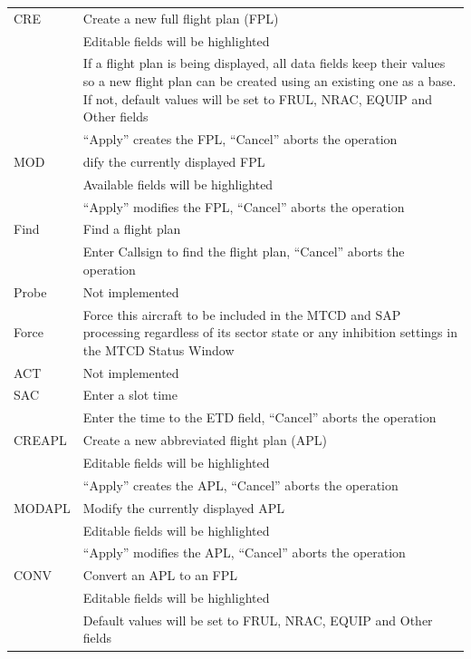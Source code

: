 \documentclass[11pt,a4paper,oldfontcommands]{memoir}
\begin{document}
\begin{tabular}{l l}
    CRE         & Create a new full flight plan (FPL)\\
                & Editable fields will be highlighted\\
                & If a flight plan is being displayed, all data fields keep their values so a new flight plan can be created using an existing one as a base. If not, default values will be set to FRUL, NRAC, EQUIP and Other fields\\
                & “Apply” creates the FPL, “Cancel” aborts the operation\\
    MOD         & dify the currently displayed FPL\\
                & Available fields will be highlighted\\
                & “Apply” modifies the FPL, “Cancel” aborts the operation\\
    Find        & Find a flight plan\\
                & Enter Callsign to find the flight plan, “Cancel” aborts the operation\\
    Probe       & Not implemented\\
    Force       & Force this aircraft to be included in the MTCD and SAP processing regardless of its sector state or any inhibition settings in the MTCD Status Window\\
    ACT         & Not implemented\\
    SAC         & Enter a slot time\\
                & Enter the time to the ETD field, “Cancel” aborts the operation\\
    CREAPL      & Create a new abbreviated flight plan (APL)\\
                & Editable fields will be highlighted\\
                & “Apply” creates the APL, “Cancel” aborts the operation\\
    MODAPL      & Modify the currently displayed APL\\
                & Editable fields will be highlighted\\
                & “Apply” modifies the APL, “Cancel” aborts the operation\\
    CONV        & Convert an APL to an FPL\\
                & Editable fields will be highlighted\\
                & Default values will be set to FRUL, NRAC, EQUIP and Other fields\\

\end{tabular}
\end{document}
